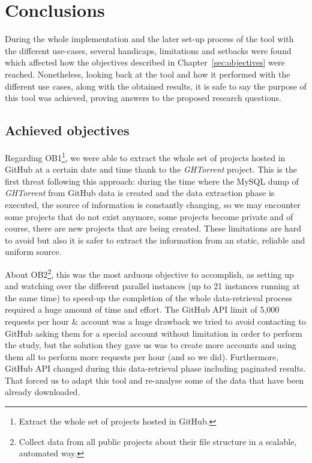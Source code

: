 \documentclass[a4paper, 12pt]{book}
\begin{document}
\chapter{Conclusions}
\label{sec:conclusions}

During the whole implementation and the later set-up process of the tool with the different use-cases,
several handicaps, limitations and setbacks were found which affected how the objectives described
in Chapter~\ref{sec:objectives} were reached. Nonetheless, looking back at the tool and how
it performed with the different use cases, along with the obtained results, it is safe to
say the purpose of this tool was achieved, proving answers to the proposed research questions.
\section{Achieved objectives}
\label{sec:achieved-objectives}

Regarding OB1\footnote{Extract the whole set of projects hosted in GitHub.},
we were able to extract the whole set of projects hosted in GitHub at
a certain date and time thank to the \emph{GHTorrent} project. This is the first threat
following this approach: during the time where the MySQL dump of \emph{GHTorrent} from GitHub data is created
and the data extraction phase is executed, the source of information is constantly changing,
so we may encounter some projects that do not exist anymore, some projects become private
and of course, there are new projects that are being created. These limitations are hard
to avoid but also it is safer to extract the information from an static, reliable and uniform source.

About OB2\footnote{Collect data from all public projects about their file structure in a scalable, automated way.},
this was the most arduous objective to accomplish, as setting up and watching over
the different parallel instances (up to 21 instances running at the same time) to speed-up the completion
of the whole data-retrieval process required a huge amount of time and effort. The GitHub API limit of
5,000 requests per hour \& account was a huge drawback we tried to avoid contacting to GitHub asking them for a special
account without limitation in order to perform the study, but the solution they gave us was to create more accounts
and using them all to perform more requests per hour (and so we did). Furthermore, GitHub API changed during this
data-retrieval phase including paginated results. That forced us to adapt this tool and re-analyse some of the data
that have been already downloaded.
\end{document}
